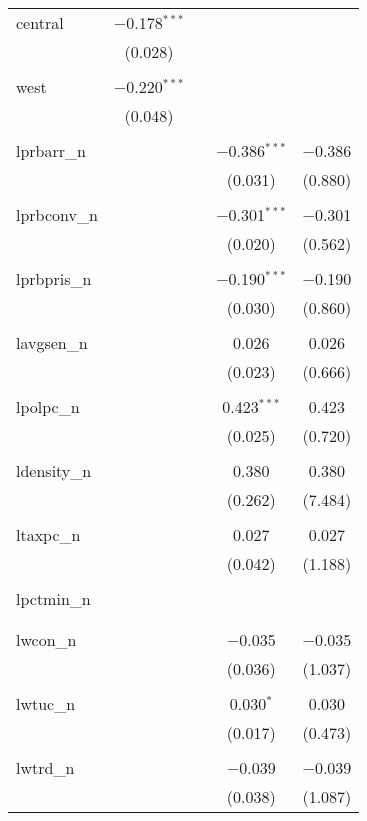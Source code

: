 \begin{tabular}{@{\extracolsep{5pt}}lcccc}
 central & $-$0.178$^{***}$ &  &  &  \\ 
  & (0.028) &  &  &  \\ 
  & & & & \\ 
 west & $-$0.220$^{***}$ &  &  &  \\ 
  & (0.048) &  &  &  \\ 
  & & & & \\ 
 lprbarr\_n &  &  & $-$0.386$^{***}$ & $-$0.386 \\ 
  &  &  & (0.031) & (0.880) \\ 
  & & & & \\ 
 lprbconv\_n &  &  & $-$0.301$^{***}$ & $-$0.301 \\ 
  &  &  & (0.020) & (0.562) \\ 
  & & & & \\ 
 lprbpris\_n &  &  & $-$0.190$^{***}$ & $-$0.190 \\ 
  &  &  & (0.030) & (0.860) \\ 
  & & & & \\ 
 lavgsen\_n &  &  & 0.026 & 0.026 \\ 
  &  &  & (0.023) & (0.666) \\ 
  & & & & \\ 
 lpolpc\_n &  &  & 0.423$^{***}$ & 0.423 \\ 
  &  &  & (0.025) & (0.720) \\ 
  & & & & \\ 
 ldensity\_n &  &  & 0.380 & 0.380 \\ 
  &  &  & (0.262) & (7.484) \\ 
  & & & & \\ 
 ltaxpc\_n &  &  & 0.027 & 0.027 \\ 
  &  &  & (0.042) & (1.188) \\ 
  & & & & \\ 
 lpctmin\_n &  &  &  &  \\ 
  &  &  &  &  \\ 
  & & & & \\ 
 lwcon\_n &  &  & $-$0.035 & $-$0.035 \\ 
  &  &  & (0.036) & (1.037) \\ 
  & & & & \\ 
 lwtuc\_n &  &  & 0.030$^{*}$ & 0.030 \\ 
  &  &  & (0.017) & (0.473) \\ 
  & & & & \\ 
 lwtrd\_n &  &  & $-$0.039 & $-$0.039 \\ 
  &  &  & (0.038) & (1.087) \\ 

\end{tabular}
